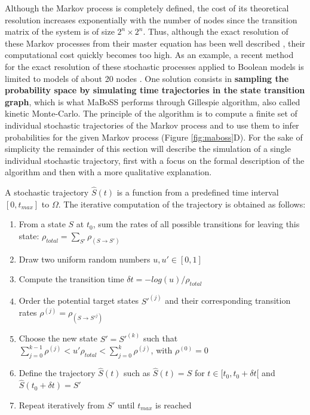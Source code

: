 \documentclass[a4paper,12pt,twoside,onecolumn,openright,final,oldfontcommands]{memoir}
\providecommand{\tightlist}{%
  \setlength{\itemsep}{0pt}\setlength{\parskip}{0pt}}
\begin{document}
Although the Markov process is completely defined, the cost of its
theoretical resolution increases exponentially with the number of nodes
since the transition matrix of the system is of size \(2^n \times 2^n\).
Thus, although the exact resolution of these Markov processes from their
master equation has been well described \citep{van2004stochastic}, their
computational cost quickly becomes too high. As an example, a recent
method for the exact resolution of these stochastic processes applied to
Boolean models is limited to models of about 20 nodes
\citep{koltai2020exact}. One solution consists in \textbf{sampling the
probability space by simulating time trajectories in the state
transition graph}, which is what MaBoSS performs through Gillespie
algorithm, also called kinetic Monte-Carlo. The principle of the
algorithm is to compute a finite set of individual stochastic
trajectories of the Markov process and to use them to infer
probabilities for the given Markov process (Figure \ref{fig:maboss}D).
For the sake of simplicity the remainder of this section will describe
the simulation of a single individual stochastic trajectory, first with
a focus on the formal description of the algorithm and then with a more
qualitative explanation.

A stochastic trajectory \(\hat{S}(t)\) is a function from a predefined
time interval \([ 0, t_{max}]\) to \(\Omega\). The iterative computation
of the trajectory is obtained as follows:

\begin{enumerate}
\def\labelenumi{\arabic{enumi}.}
\tightlist
\item
  From a state \(S\) at \(t_0\), sum the rates of all possible
  transitions for leaving this state:
  \(\rho_{total}=\sum_{S'}{\rho_{(S \rightarrow S')}}\)
\item
  Draw two uniform random numbers \(u,u' \in [0,1]\)
\item
  Compute the transition time \(\delta t=-log(u)/\rho_{total}\)
\item
  Order the potential target states \(S'^{(j)}\) and their corresponding
  transition rates \(\rho^{(j)}=\rho_{(S \rightarrow S'^{j})}\)
\item
  Choose the new state \(S'=S'^{(k)}\) such that
  \(\sum_{j=0}^{k-1} \rho^{(j)} < u'\rho_{total} < \sum_{j=0}^{k} \rho^{(j)}\),
  with \(\rho^{(0)}=0\)
\item
  Define the trajectory \(\hat{S}(t)\) such as \(\hat{S}(t)=S\) for
  \(t \in [t_0, t_0 + \delta t[\) and \(\hat{S}(t_0 + \delta t) = S'\)
\item
  Repeat iteratively from \(S'\) until \(t_{max}\) is reached
\end{enumerate}
\end{document}
